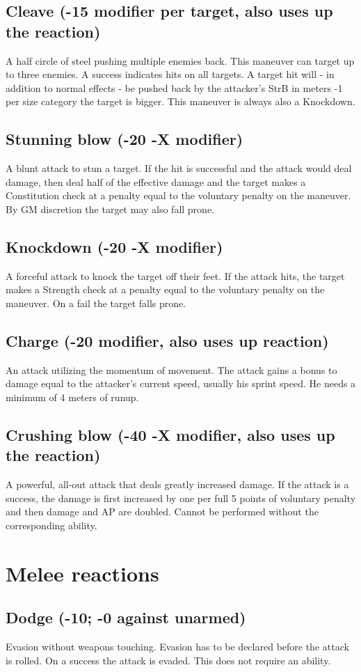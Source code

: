 \documentclass[12pt,a4paper,openany]{book}
\begin{document}
	\subsection*{Cleave (-15 modifier per target, also uses up the reaction)}
	A half circle of steel pushing multiple enemies back. This maneuver can target up to three enemies. A success indicates hits on all targets. A target hit will - in addition to normal effects - be pushed back by the attacker’s StrB in meters -1 per size category the target is bigger. This maneuver is always also a Knockdown.
	\subsection*{Stunning blow (-20 -X modifier)}
	A blunt attack to stun a target. If the hit is successful and the attack would deal damage, then deal half of the effective damage and the target makes a Constitution check at a penalty equal to the voluntary penalty on the maneuver. By GM discretion the target may also fall prone.
	\subsection*{Knockdown (-20 -X modifier)}
	A forceful attack to knock the target off their feet. If the attack hits, the target makes a Strength check at a penalty equal to the voluntary penalty on the maneuver. On a fail the target falls prone.
	\subsection*{Charge (-20 modifier, also uses up reaction)}
	An attack utilizing the momentum of movement. The attack gains a bonus to damage equal to the attacker’s current speed, usually his sprint speed. He needs a minimum of 4 meters of runup.
	\subsection*{Crushing blow (-40 -X modifier, also uses up the reaction)}
	A powerful, all-out attack that deals greatly increased damage. If the attack is a success, the damage is first increased by one per full 5 points of voluntary penalty and then damage and AP are doubled. Cannot be performed without the corresponding ability.
	\section{Melee reactions}
	\subsection*{Dodge (-10; -0 against unarmed)}
	Evasion without weapons touching. Evasion has to be declared before the attack is rolled. On a success the attack is evaded. This does not require an ability.
\end{document}
